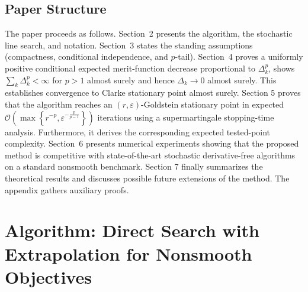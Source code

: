 \documentclass[11pt,a4paper]{article}
\newcommand{\Dexp}{p}
\newcommand{\goldelta}{r}
\begin{document}
\subsection{Paper Structure} \label{subsec:paper_structure}
The paper proceeds as follows. 
Section~2 presents the algorithm, the stochastic line search, and notation.
Section~3 states the standing assumptions (compactness, conditional independence, and $\Dexp$-tail).
Section~4 proves a uniformly positive conditional expected merit-function decrease proportional  to $\Delta_k^p$, shows $\sum_k \Delta_k^{\Dexp}<\infty$ for $\Dexp >1$ almost surely and hence $\Delta_k\to 0$ almost surely. This establishes convergence to Clarke stationary point almost surely. Section 5 proves that the algorithm reaches an $(\goldelta,\varepsilon)$-Goldstein stationary point in expected $\mathcal O\left(\max\left\{\goldelta^{-\Dexp}, \varepsilon^{-\frac{\Dexp}{\Dexp-1}}\right\}\right)$ iterations %
using a supermartingale stopping-time analysis. Furthermore, it derives
the corresponding expected tested-point complexity.
Section~6 presents numerical experiments showing that the proposed method is competitive with state-of-the-art stochastic derivative-free algorithms on a standard nonsmooth benchmark.
Section 7 finally summarizes the theoretical results and discusses possible future extensions of the method. The appendix gathers auxiliary proofs.


% 

\section{Algorithm: Direct Search with Extrapolation for Nonsmooth Objectives} \label{sec:algo}
\end{document}
